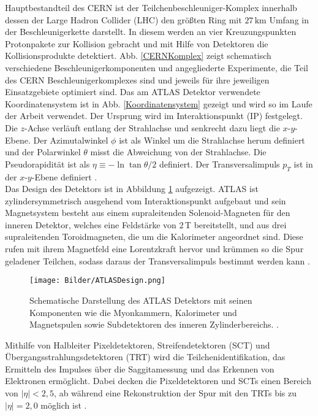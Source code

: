 Hauptbestandteil des CERN ist der Teilchenbeschleuniger-Komplex innerhalb dessen der Large Hadron Collider (LHC) den größten Ring mit $27\,\text{km}$ Umfang in der Beschleunigerkette darstellt. In diesem werden an vier Kreuzungspunkten Protonpakete zur Kollision gebracht und mit Hilfe von Detektoren die Kollisionsprodukte detektiert. Abb. \ref{CERNKomplex} zeigt schematisch verschiedene Beschleunigerkomponenten und angegliederte Experimente, die Teil des CERN Beschleunigerkomplexes sind und jeweils für ihre jeweiligen Einsatzgebiete optimiert sind.
Das am ATLAS Detektor verwendete Koordinatensystem ist in Abb. \ref{Koordinatensystem} gezeigt und wird so im Laufe der Arbeit verwendet. Der Ursprung wird im Interaktionspunkt (IP) festgelegt. Die $z$-Achse verläuft entlang der Strahlachse und senkrecht dazu liegt die $x$-$y$-Ebene. Der Azimutalwinkel $\phi$ ist als Winkel um die Strahlachse herum definiert und der Polarwinkel $\theta$ misst die Abweichung von der Strahlachse. Die Pseudorapidität ist als $\eta\equiv -\ln\tan{\theta/2}$ definiert. Der Transversalimpuls $p_T$ ist in der $x$-$y$-Ebene definiert \cite{ATLAS}.\\ 
Das Design des Detektors ist in Abbildung \ref{ATLASDesign} aufgezeigt. ATLAS ist zylindersymmetrisch ausgehend vom Interaktionspunkt aufgebaut und sein Magnetsystem be\-steht aus einem supraleitenden Solenoid-Magneten für den inneren Detektor, welches eine Feldstärke von $2\,$T bereitstellt, und aus drei supraleitenden Toroidmagneten, die um die Kalorimeter angeordnet sind. Diese rufen mit ihrem Magnetfeld eine Lorentzkraft hervor und krümmen so die Spur geladener Teilchen, sodass daraus der Transversalimpuls bestimmt werden kann \cite{ATLAS}.\\
\begin{figure}[htbp]                                 
  \begin{center}                                       
  \texttt{[image: Bilder/ATLASDesign.png]} 
   \caption[Schematische Darstellung des ATLAS Detektors]{Schematische Darstellung des ATLAS Detektors mit seinen Komponenten wie die Myonkammern, Kalorimeter und Magnetspulen sowie Subdetektoren des inneren Zylinderbereichs. \cite{ATLAS}.}
   \label{ATLASDesign}                                     
   \end{center}
\end{figure}
Mithilfe von Halbleiter Pixeldetektoren, Streifendetektoren (SCT) und Über\-gangs\-strahlungs\-de\-tek\-to\-ren (TRT) wird die Teilchenidentifikation, das Ermitteln des Impulses über die Saggitamessung und das Erkennen von Elektronen ermöglicht. Dabei decken die Pixeldetektoren und SCTs einen Bereich von $|\eta|<2,5$, ab während eine Rekonstruktion der Spur mit den TRTs bis zu $|\eta|=2,0$ möglich ist \cite{ATLAS}.\\
